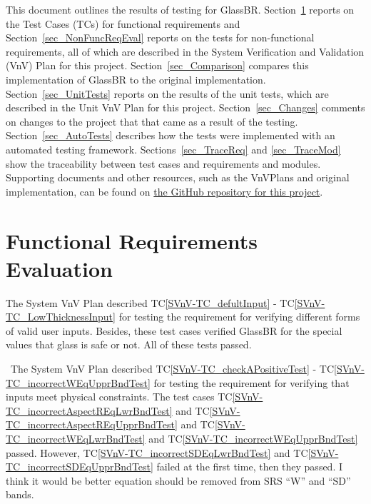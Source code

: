 \documentclass[12pt, titlepage]{article}
\newcommand{\progname}{GlassBR}
\newcommand{\tcref}[1]{TC\ref{#1}}
\begin{document}
	\listoffigures %
	
	\newpage
	
	
	This document outlines the results of testing for \progname{}. 
	Section~\ref{sec_FuncReqEval} reports on the Test Cases (TCs) for functional 
	requirements and Section~\ref{sec_NonFuncReqEval} reports on the tests for 
	non-functional requirements, all of which are described in the System 
	Verification and Validation (VnV) Plan for this project. 
	Section~\ref{sec_Comparison} compares this implementation of \progname{} to the 
	original implementation. Section~\ref{sec_UnitTests} reports on the results of 
	the unit tests, which are described in the Unit VnV Plan for this project. 
	Section~\ref{sec_Changes} comments on changes to the project that that came as 
	a result of the testing. Section~\ref{sec_AutoTests} describes how the tests 
	were implemented with an automated testing framework. 
	Sections~\ref{sec_TraceReq} and \ref{sec_TraceMod} show the traceability 
	between test cases and requirements and modules. Supporting documents and other 
	resources, such as the VnVPlans and original implementation, can be found on 
	\href{https://github.com/smiths/caseStudies/tree/master/CaseStudies/glass}{the 
		GitHub repository for this project}.
	
	\section{Functional Requirements Evaluation} \label{sec_FuncReqEval}
	
	The System VnV Plan described \tcref{SVnV-TC_defultInput} - 
	\tcref{SVnV-TC_LowThicknessInput} for testing the requirement for 
	verifying different forms of valid user inputs. Besides, these test cases verified \progname{}
	 for the special values that glass is safe or not. All of these tests passed. 
	
	~\newline \noindent The System VnV Plan described \tcref{SVnV-TC_checkAPositiveTest} - 
	\tcref{SVnV-TC_incorrectWEqUpprBndTest} for testing the requirement for 
	verifying that inputs meet physical constraints. The test cases \tcref{SVnV-TC_incorrectAspectREqLwrBndTest} and \tcref{SVnV-TC_incorrectAspectREqUpprBndTest} and \tcref{SVnV-TC_incorrectWEqLwrBndTest} and \tcref{SVnV-TC_incorrectWEqUpprBndTest} passed.
	However, \tcref{SVnV-TC_incorrectSDEqLwrBndTest} and \tcref{SVnV-TC_incorrectSDEqUpprBndTest} failed at the first time, then they passed. I think it would be better equation should be removed from SRS ``W'' and ``SD'' bands.
	
\end{document}

